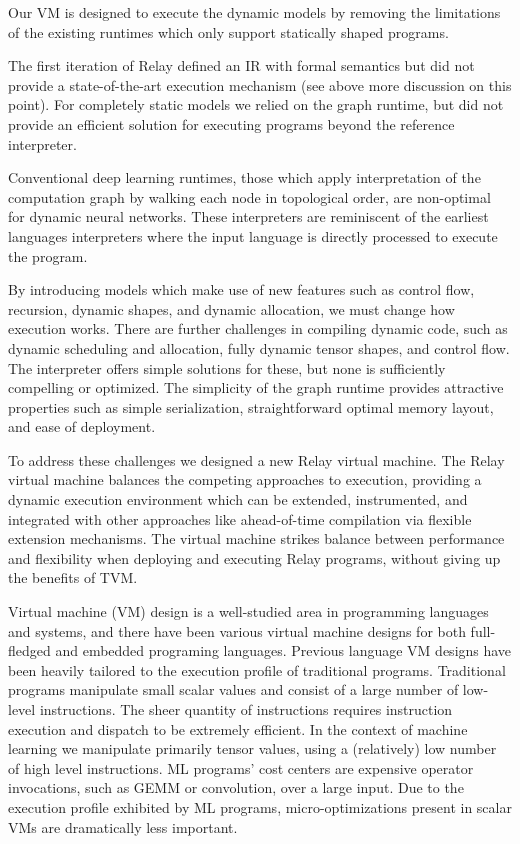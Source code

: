 Our VM is designed to execute the dynamic models by removing the limitations of the existing runtimes which only support statically shaped programs.

The first iteration of Relay defined an IR with formal semantics
  but did not provide a state-of-the-art execution mechanism (see above more discussion on this point).
For completely static models we relied on the graph runtime,
  but did not provide an efficient solution for executing
  programs beyond the reference interpreter.

Conventional deep learning runtimes, those which apply interpretation of the
  computation graph by walking each node in topological order, are non-optimal
  for dynamic neural networks.
These interpreters are reminiscent of the earliest
  languages interpreters where the input language is directly
  processed to execute the program.

By introducing models which make use of new features such
  as control flow, recursion, dynamic shapes, and dynamic allocation,
  we must change how execution works.
There are further challenges in compiling dynamic code, such as dynamic scheduling and allocation,
  fully dynamic tensor shapes, and control flow.
The interpreter offers simple solutions for these, but none is sufficiently compelling or optimized.
The simplicity of the graph runtime provides attractive
  properties such as simple serialization, straightforward
  optimal memory layout, and ease of deployment.

To address these challenges we designed a new Relay
  virtual machine.
The Relay virtual machine balances the competing approaches to execution,
  providing a dynamic execution environment which can be extended, instrumented,
  and integrated with other approaches
  like ahead-of-time compilation via flexible extension mechanisms.
The virtual machine strikes balance between performance and flexibility
  when deploying and executing Relay programs, without giving up the benefits of TVM.

Virtual machine (VM) design is a well-studied area in programming languages and systems,
  and there have been various virtual machine designs for both full-fledged and embedded programing languages.
Previous language VM designs have been heavily tailored to the execution profile of traditional programs.
Traditional programs manipulate small scalar values
  and consist of a large number of low-level instructions.
The sheer quantity of instructions requires instruction execution
  and dispatch to be extremely efficient.
In the context of machine learning we manipulate primarily tensor values,
  using a (relatively) low number of high level instructions.
ML programs’ cost centers are expensive operator invocations,
  such as GEMM or convolution, over a large input.
Due to the execution profile exhibited by ML programs,
  micro-optimizations present in scalar VMs are dramatically less important.

